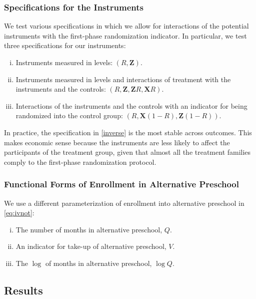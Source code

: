\subsubsection{Specifications for the Instruments}
\noindent We test various specifications in which we allow for interactions of the potential instruments with the first-phase randomization indicator. In particular, we test three specifications for our instruments:

\begin{enumerate}[(i)]
\item Instruments measured in levels: $ \left( R,\mathbf{Z} \right) $.
\item\label{interact} Instruments measured in levels and interactions of treatment with the instruments and the controls: $ \left(R,\mathbf{Z},\mathbf{Z}R,\mathbf{X}R \right)$.
\item\label{inverse} Interactions of the instruments and the controls with an indicator for being randomized into the control group: $\left( R, \mathbf{X} \left( 1-R \right), \mathbf{Z} \left( 1-R \right) \right)$.
\end{enumerate}

\noindent In practice, the specification in \eqref{inverse} is the most stable across outcomes. This makes economic sense because the instruments are less likely to affect the participants of the treatment group, given that almost all the treatment families comply to the first-phase randomization protocol.

\subsubsection{Functional Forms of Enrollment in Alternative Preschool}

\noindent We use a different parameterization of enrollment into alternative preschool in \eqref{eq:ivnot}:

\begin{enumerate}[(i)]
\item The number of months in alternative preschool, $Q$.
\item An indicator for take-up of alternative preschool, $V$.
\item The $\log$ of months in alternative preschool, $\log Q$.
\end{enumerate}

\subsection{Results}

